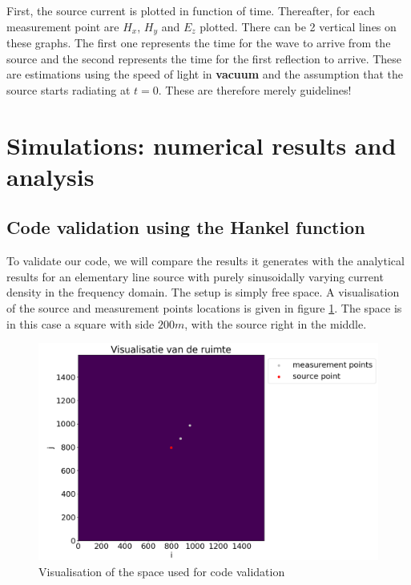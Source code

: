 \documentclass[11pt, a4paper]{article}
\begin{document}
First, the source current is plotted in function of time.
Thereafter, for each measurement point are $H_x$, $H_y$ and $E_z$ plotted. There can be 2 vertical lines on these graphs. The first one represents the time for the wave to arrive from the source and the second represents the time for the first reflection to arrive. These are estimations using the speed of light in \textbf{vacuum} and the assumption that the source starts radiating at $t = 0$. These are therefore merely guidelines!


\section{Simulations: numerical results and analysis}

\subsection{Code validation using the Hankel function} \label{hankel} %

To validate our code, we will compare the results it generates with the analytical results for an elementary line source with purely sinusoidally varying current density in the frequency domain. The setup is simply free space. A visualisation of the source and measurement points locations is given in figure \ref{fig:visual_code_validation}. The space is in this case a square with side $200 m$, with the source right in the middle.

\begin{figure}[H]
    \centering
    \includegraphics[width=0.95\linewidth]{fig/em_vis_hankel.png}
    \caption{Visualisation of the space used for code validation}
    \label{fig:visual_code_validation}
\end{figure}
\end{document}
